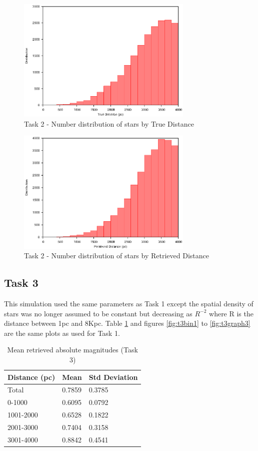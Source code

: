 \documentclass[a4paper,12pt]{article}
\begin{document}
\begin{figure}[H]
\centering
\includegraphics[width=0.75\textwidth]{./Task2/Graph2}
\caption{Task 2 - Number distribution of stars by True Distance}
\label{fig:t2graph2}
\end{figure}

\begin{figure}[H]
\centering
\includegraphics[width=0.75\textwidth]{./Task2/Graph3}
\caption{Task 2 - Number distribution of stars by Retrieved Distance}
\label{fig:t2graph3}
\end{figure}

\newpage
\subsection{Task 3}
This simulation used the same parameters as Task 1 except the spatial density of stars was no longer assumed to be constant but decreasing as $R^{-2}$ where R is the distance between 1pc and 8Kpc. Table \ref{tab:task3} and figures \ref{fig:t3bin1} to \ref{fig:t3graph3} are the same plots as used for Task 1.
 
\begin{table}[ht]
\centering
\begin{tabular}{|l|l|l|}
\hline
Distance (pc) & Mean & Std Deviation \\
\hline
Total & 0.7859 & 0.3785 \\
0-1000 & 0.6095 & 0.0792 \\
1001-2000 & 0.6528 & 0.1822 \\
2001-3000 & 0.7404 & 0.3158 \\
3001-4000 & 0.8842 & 0.4541 \\
\hline
\end{tabular}
\caption{\label{tab:task3}Mean retrieved absolute magnitudes (Task 3)}
\end{table}
\end{document}
